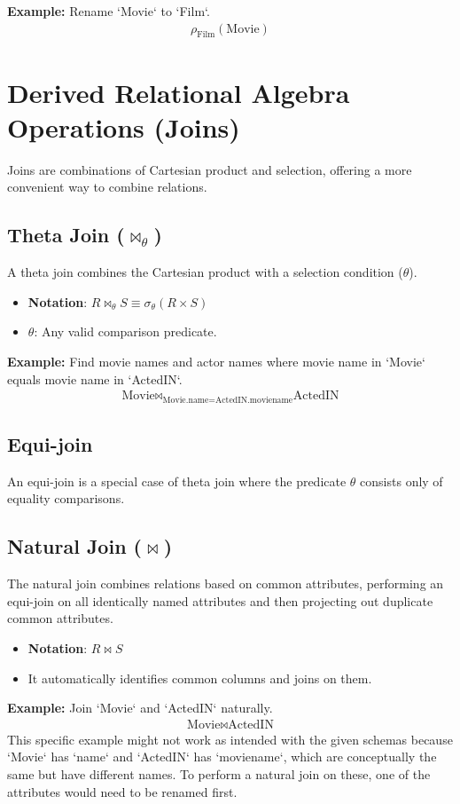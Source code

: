\documentclass{article}
\newcommand{\sel}{\sigma} %
\newcommand{\ren}{\rho} %
\newcommand{\join}{\bowtie} %
\begin{document}
\textbf{Example:} Rename `Movie` to `Film`.
\begin{align*}
    \ren_{\text{Film}}(\text{Movie}) \tag{5} \label{eq:rename_relation} \text{}
\end{align*}

\section*{Derived Relational Algebra Operations (Joins)}
Joins are combinations of Cartesian product and selection, offering a more convenient way to combine relations.

\subsection*{Theta Join ($\join_\theta$)}
A theta join combines the Cartesian product with a selection condition ($\theta$).
\begin{itemize}
    \item \textbf{Notation}: $R \join_\theta S \equiv \sel_\theta(R \times S)$ 
    \item \textbf{$\theta$}: Any valid comparison predicate.
\end{itemize}

\textbf{Example:} Find movie names and actor names where movie name in `Movie` equals movie name in `ActedIN`.
\begin{align*}
    \text{Movie} \join_{\text{Movie.name} = \text{ActedIN.moviename}} \text{ActedIN} \tag{6} \label{eq:theta_join} \text{}
\end{align*}

\subsection*{Equi-join}
An equi-join is a special case of theta join where the predicate $\theta$ consists only of equality comparisons.

\subsection*{Natural Join ($\join$)}
The natural join combines relations based on common attributes, performing an equi-join on all identically named attributes and then projecting out duplicate common attributes.
\begin{itemize}
    \item \textbf{Notation}: $R \join S$ 
    \item It automatically identifies common columns and joins on them.
\end{itemize}

\textbf{Example:} Join `Movie` and `ActedIN` naturally.
\begin{align*}
    \text{Movie} \join \text{ActedIN} \tag{7} \label{eq:natural_join} \text{}
\end{align*}
This specific example might not work as intended with the given schemas because `Movie` has `name` and `ActedIN` has `moviename`, which are conceptually the same but have different names. To perform a natural join on these, one of the attributes would need to be renamed first.
\end{document}
